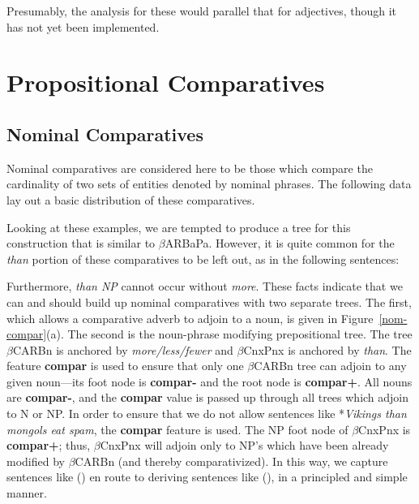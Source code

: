 
\noindent Presumably, the analysis for these would parallel that for
adjectives, though it has not yet been implemented.


\section{Propositional Comparatives}

\subsection{Nominal Comparatives}\label{nom-comparatives-section}

Nominal comparatives are considered here to be those which compare the
cardinality of two sets of entities denoted by nominal phrases.  The
following data lay out a basic distribution of these comparatives.


Looking at these examples, we are tempted to produce a tree for this
construction that is similar to $\beta$ARBaPa.  However, it is quite
common for the {\it than} portion of these comparatives to be left
out, as in the following sentences:


\noindent Furthermore, {\it than NP} cannot occur without {\it more}.
These facts indicate that we can and should build up nominal
comparatives with two separate trees.  The first, which allows a
comparative adverb to adjoin to a noun, is given in
Figure~\ref{nom-compar}(a). The second is the noun-phrase modifying
prepositional tree.  The tree $\beta$CARBn is anchored by {\it
more/less/fewer} and $\beta$CnxPnx is anchored by {\it than}.  The
feature {\bf compar} is used to ensure that only one $\beta$CARBn tree
can adjoin to any given noun---its foot node is {\bf compar-} and the
root node is {\bf compar+}.  All nouns are {\bf compar-}, and the {\bf
compar} value is passed up through all trees which adjoin to N or NP.
In order to ensure that we do not allow sentences like *{\it Vikings
than mongols eat spam}, the {\bf compar} feature is used.  The NP foot
node of $\beta$CnxPnx is {\bf compar+}; thus, $\beta$CnxPnx will
adjoin only to NP's which have been already modified by $\beta$CARBn
(and thereby comparativized).  In this way, we capture sentences like
() en route to deriving sentences like (), in a
principled and simple manner.

